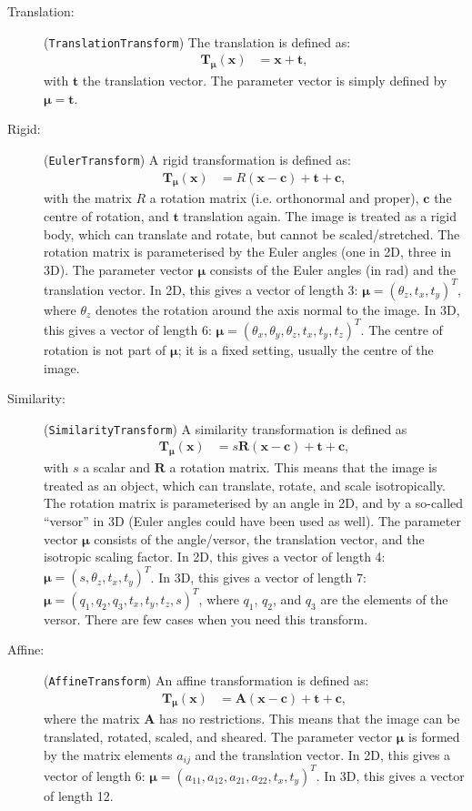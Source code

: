 \documentclass[]{report}
\newcommand{\vx}{\bm{x}}
\newcommand{\vmu}{\bm{\mu}}
\newcommand{\vTmx}{\bm{T}_{\vmu}(\bm{x})}
\begin{document}
\begin{description}
\item[Translation:] (\texttt{TranslationTransform}) The translation is defined as:
\begin{align}
\vTmx &= \vx + \bm{t},
\end{align}
with $\bm{t}$ the translation vector. The parameter vector is
simply defined by $\vmu=\bm{t}$.

\item[Rigid:] (\texttt{EulerTransform}) A rigid transformation is defined as:
\begin{align}
\vTmx &= R (\vx - \bm{c}) + \bm{t} + \bm{c},
\end{align}
with the matrix $R$ a rotation matrix (i.e. orthonormal and
proper), $\bm{c}$ the centre of rotation, and $\bm{t}$ translation
again. The image is treated as a rigid body, which can translate
and rotate, but cannot be scaled/stretched. The rotation matrix is
parameterised by the Euler angles (one in 2D, three in 3D). The
parameter vector $\vmu$ consists of the Euler angles (in rad) and
the translation vector. In 2D, this gives a vector of length 3:
$\vmu = (\theta_z, t_x, t_y)^T$, where $\theta_z$ denotes the
rotation around the axis normal to the image. In 3D, this gives a
vector of length 6: $\vmu = (\theta_x, \theta_y, \theta_z, t_x,
t_y, t_z)^T$. The centre of rotation is not part of $\vmu$; it is
a fixed setting, usually the centre of the image.

\item[Similarity:] (\texttt{SimilarityTransform}) A similarity transformation is defined as
\begin{align}
\vTmx &= s \bm{R} (\vx - \bm{c}) + \bm{t} + \bm{c},
\end{align}
with $s$ a scalar and $\bm{R}$ a rotation matrix. This means that the image
is treated as an object, which can translate, rotate, and scale
isotropically. The rotation matrix is parameterised by an angle in 2D, and
by a so-called ``versor'' in 3D (Euler angles could have been used as
well). The parameter vector $\vmu$ consists of the angle/versor, the
translation vector, and the isotropic scaling factor. In 2D, this gives a
vector of length 4: $\vmu = (s, \theta_z, t_x, t_y)^T$. In 3D, this gives a
vector of length 7: $\vmu = (q_1, q_2, q_3, t_x, t_y, t_z, s)^T$, where
$q_1$, $q_2$, and $q_3$ are the elements of the versor. There are few cases
when you need this transform.

\item[Affine:] (\texttt{AffineTransform}) An affine transformation is defined as:
\begin{align}
\vTmx &= \bm{A} (\vx - \bm{c}) + \bm{t} + \bm{c},
\end{align}
where the matrix $\bm{A}$ has no restrictions. This means that the image
can be translated, rotated, scaled, and sheared. The parameter vector
$\vmu$ is formed by the matrix elements $a_{ij}$ and the translation
vector. In 2D, this gives a vector of length 6: $\vmu=(a_{11}, a_{12},
a_{21}, a_{22}, t_x, t_y)^T$. In 3D, this gives a vector of length 12.


\end{description}
\end{document}
